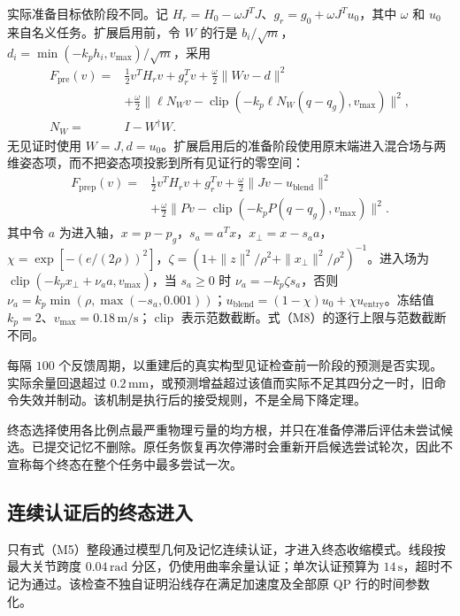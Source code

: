 实际准备目标依阶段不同。记 $H_r=H_0-\omega J^TJ$、$g_r=g_0+\omega J^Tu_0$，其中 $\omega$ 和 $u_0$ 来自名义任务。扩展启用前，令 $W$ 的行是 $b_i/\sqrt m$，$d_i=\min(-k_p h_i,v_{\max})/\sqrt m$，采用
\begin{equation}
\begin{aligned}
 F_{\mathrm{pre}}(v)={}&\tfrac12v^TH_rv+g_r^Tv+\tfrac\omega2\|Wv-d\|^2\\
 &+\tfrac\omega2\|\ell N_Wv-\operatorname{clip}(-k_p\ell N_W(q-q_g),v_{\max})\|^2,\\
 N_W={}&I-W^\dagger W.
\end{aligned}\tag{M8}
\end{equation}
无见证时使用 $W=J,d=u_0$。扩展启用后的准备阶段使用原末端进入混合场与两维姿态项，而不把姿态项投影到所有见证行的零空间：
\begin{equation}
\begin{aligned}
 F_{\mathrm{prep}}(v)={}&\tfrac12v^TH_rv+g_r^Tv+\tfrac\omega2\|Jv-u_{\mathrm{blend}}\|^2\\
 &+\tfrac\omega2\|Pv-\operatorname{clip}(-k_pP(q-q_g),v_{\max})\|^2.
\end{aligned}\tag{M9}
\end{equation}
其中令 $a$ 为进入轴，$x=p-p_g$，$s_a=a^Tx$，$x_\perp=x-s_a a$，$\chi=\exp[-(e/(2\rho))^2]$，$\zeta=(1+\|z\|^2/\rho^2+\|x_\perp\|^2/\rho^2)^{-1}$。进入场为 $\operatorname{clip}(-k_p x_\perp+\nu_a a,v_{\max})$，当 $s_a\ge0$ 时 $\nu_a=-k_p\zeta s_a$，否则 $\nu_a=k_p\min(\rho,\max(-s_a,0.001))$；$u_{\mathrm{blend}}=(1-\chi)u_0+\chi u_{\mathrm{entry}}$。冻结值 $k_p=2$、$v_{\max}=0.18\,\mathrm{m/s}$；$\operatorname{clip}$ 表示范数截断。式（M8）的逐行上限与范数截断不同。

每隔 $100$ 个反馈周期，以重建后的真实构型见证检查前一阶段的预测是否实现。实际余量回退超过 $0.2\,\mathrm{mm}$，或预测增益超过该值而实际不足其四分之一时，旧命令失效并制动。该机制是执行后的接受规则，不是全局下降定理。

终态选择使用各比例点最严重物理亏量的均方根，并只在准备停滞后评估未尝试候选。已提交记忆不删除。原任务恢复再次停滞时会重新开启候选尝试轮次，因此不宣称每个终态在整个任务中最多尝试一次。

\subsection{连续认证后的终态进入}
只有式（M5）整段通过模型几何及记忆连续认证，才进入终态收缩模式。线段按最大关节跨度 $0.04\,\mathrm{rad}$ 分区，仍使用曲率余量认证；单次认证预算为 $14\,\mathrm s$，超时不记为通过。该检查不独自证明沿线存在满足加速度及全部原 QP 行的时间参数化。

